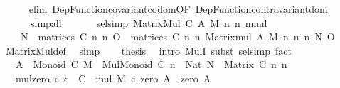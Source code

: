 \begin{isabellebody}
\ \ \ \ \isamarkupfalse%
\ {\isacharparenleft}{\kern0pt}elim\ Dep{\isacharunderscore}{\kern0pt}Function{\isacharunderscore}{\kern0pt}covariant{\isacharunderscore}{\kern0pt}codom{\isacharbrackleft}{\kern0pt}OF\ Dep{\isacharunderscore}{\kern0pt}Function{\isacharunderscore}{\kern0pt}contravariant{\isacharunderscore}{\kern0pt}dom{\isacharbrackright}{\kern0pt}{\isacharparenright}{\kern0pt}\isanewline
\ \ \ \ \ \ simp{\isacharunderscore}{\kern0pt}all\isanewline
\ \ \isanewline
\ \ \isamarkupfalse%
\ sel{\isacharunderscore}{\kern0pt}simp{\isacharcolon}{\kern0pt}\ {\isachardoublequoteopen}{\isacharparenleft}{\kern0pt}Matrix{\isacharunderscore}{\kern0pt}Mul\ C\ A\ M\ n\ n\ n{\isacharparenright}{\kern0pt}{\isacharat}{\kern0pt}{\isacharat}{\kern0pt}mul\ {\isacharequal}{\kern0pt}\isanewline
\ \ \ \ {\isasymlambda}N\ {\isasymin}\ matrices\ C\ n\ n{\isachardot}{\kern0pt}\ {\isacharparenleft}{\kern0pt}{\isasymlambda}O\ {\isasymin}\ matrices\ C\ n\ n{\isachardot}{\kern0pt}\ Matrix{\isacharunderscore}{\kern0pt}mul\ A\ M\ n\ n\ n\ N\ O{\isacharparenright}{\kern0pt}{\isachardoublequoteclose}\isanewline
\ \ \ \ \isamarkupfalse%
\ Matrix{\isacharunderscore}{\kern0pt}Mul{\isacharunderscore}{\kern0pt}def\ \isamarkupfalse%
\ simp\isanewline
\ \ \isamarkupfalse%
\ {\isacharquery}{\kern0pt}thesis\ \isamarkupfalse%
\ {\isacharparenleft}{\kern0pt}intro\ MulI{\isacharcomma}{\kern0pt}\ subst\ sel{\isacharunderscore}{\kern0pt}simp{\isacharparenright}{\kern0pt}\ fact\isanewline
{}\isamarkupfalse%
%
\endisatagproof
{\isafoldproof}%
%
\isadelimproof
%
\endisadelimproof
%
\isadelimdocument
%
\endisadelimdocument
%
\isatagdocument
%
\isamarkuptrue%
%
\endisatagdocument
{\isafolddocument}%
%
\isadelimdocument
%
\endisadelimdocument
{}\isamarkupfalse%
\isanewline
\ \ \ {\isachardoublequoteopen}A\ {\isacharcolon}{\kern0pt}\ Monoid\ C{\isachardoublequoteclose}\ {\isachardoublequoteopen}M\ {\isacharcolon}{\kern0pt}\ Mul{\isacharunderscore}{\kern0pt}Monoid\ C{\isachardoublequoteclose}\ {\isachardoublequoteopen}n\ {\isacharcolon}{\kern0pt}\ Nat{\isachardoublequoteclose}\ {\isachardoublequoteopen}N\ {\isacharcolon}{\kern0pt}\ Matrix\ C\ n\ n{\isachardoublequoteclose}\isanewline
\ \ \ mul{\isacharunderscore}{\kern0pt}zero{\isacharcolon}{\kern0pt}\ {\isachardoublequoteopen}{\isasymAnd}c{\isachardot}{\kern0pt}\ c\ {\isacharcolon}{\kern0pt}\ C\ {\isasymLongrightarrow}\ mul\ M\ c\ {\isacharparenleft}{\kern0pt}zero\ A{\isacharparenright}{\kern0pt}\ {\isacharequal}{\kern0pt}\ zero\ A{\isachardoublequoteclose}\isanewline

\end{isabellebody}

